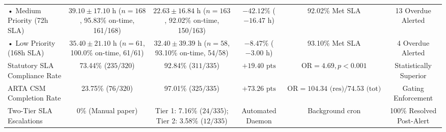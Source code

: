 \documentclass[conference]{IEEEtran}
\begin{document}
\begin{table}[t]
\begin{tabularx}{\textwidth}{lccccc}
• Medium Priority (72h SLA) & $39.10 \pm 17.10\text{ h}$ ($n = 168$, 95.83\% on-time, 161/168) & $22.63 \pm 16.84\text{ h}$ ($n = 163$, 92.02\% on-time, 150/163) & $-42.12\%$ ($-16.47\text{ h}$) & 92.02\% Met SLA & 13 Overdue Alerted \\
• Low Priority (168h SLA) & $35.40 \pm 21.10\text{ h}$ ($n = 61$, 100.0\% on-time, 61/61) & $32.40 \pm 39.39\text{ h}$ ($n = 58$, 93.10\% on-time, 54/58) & $-8.47\%$ ($-3.00\text{ h}$) & 93.10\% Met SLA & 4 Overdue Alerted \\
Statutory SLA Compliance Rate & 73.44\% ($235/320$) & 92.84\% ($311/335$) & $+19.40\text{ pts}$ & $\text{OR} = 4.69, p < 0.001$ & Statistically Superior \\
ARTA CSM Completion Rate & 23.75\% ($76/320$) & 97.01\% ($325/335$) & $+73.26\text{ pts}$ & $\text{OR} = 104.34\text{ (res)} / 74.53\text{ (tot)}$ & Gating Enforcement \\
Two-Tier SLA Escalations & 0\% (Manual paper) & Tier 1: 7.16\% ($24/335$); Tier 2: 3.58\% ($12/335$) & Automated Daemon & Background cron & 100\% Resolved Post-Alert \\
\bottomrule
\end{tabularx}
\end{table}
\end{document}
